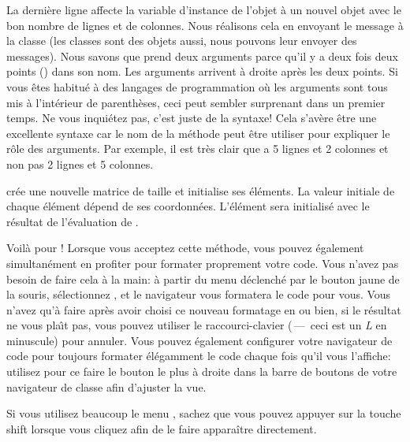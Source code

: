 \documentclass[a4paper,10pt,twoside]{book}
\begin{document}
La dernière ligne affecte la variable d'instance  de l'objet
 à un nouvel objet  avec le bon nombre de lignes et de colonnes.
Nous réalisons cela en envoyant le message  à la classe  (les classes sont des objets aussi, nous pouvons leur envoyer des messages).
Nous savons que  prend deux arguments parce qu'il y a deux fois deux points (\ct{:}) dans son nom. Les arguments arrivent à droite après les deux points.
Si vous \^etes habitué à des langages de programmation o\`u les arguments sont tous mis à l'intérieur de parenthèses, ceci peut sembler surprenant dans un premier temps. Ne vous inquiétez pas, c'est juste de la syntaxe!
Cela s'avère \^etre une excellente syntaxe car le nom de la méthode peut \^etre utiliser pour expliquer le rôle des arguments. Par exemple, il est très clair que  a 5 lignes et 2 colonnes et non pas 2 lignes et 5 colonnes.

 crée une nouvelle matrice de taille  et initialise ses éléments. La valeur initiale de chaque élément dépend de ses coordonnées. L'élément  sera initialisé avec le résultat de l'évaluation de .  

Voilà pour !  Lorsque vous acceptez cette méthode, vous
pouvez également simultanément en profiter pour formater proprement
votre code. Vous n'avez pas besoin de faire cela à la main: à partir
du menu déclenché par le bouton jaune de la souris, sélectionnez
, et le navigateur vous formatera
le code pour vous. Vous n'avez qu'à faire  après avoir 
choisi ce nouveau formatage en  ou 
bien, si le résultat ne vous pla\^{\i}t pas, vous pouvez utiliser 
le raccourci-clavier 
(\,---\, ceci est un \emph{L} en minuscule) pour annuler.
Vous pouvez également configurer votre navigateur de code pour
toujours formater élégamment le code chaque fois qu'il vous
l'affiche:
utilisez pour ce faire le bouton le plus à droite dans la barre de
boutons de votre navigateur de classe afin d'ajuster la vue.

Si vous utilisez beaucoup le menu , sachez que
vous pouvez appuyer sur la touche {\sc shift} lorsque vous cliquez
afin de le faire apparaître directement.
\end{document}
